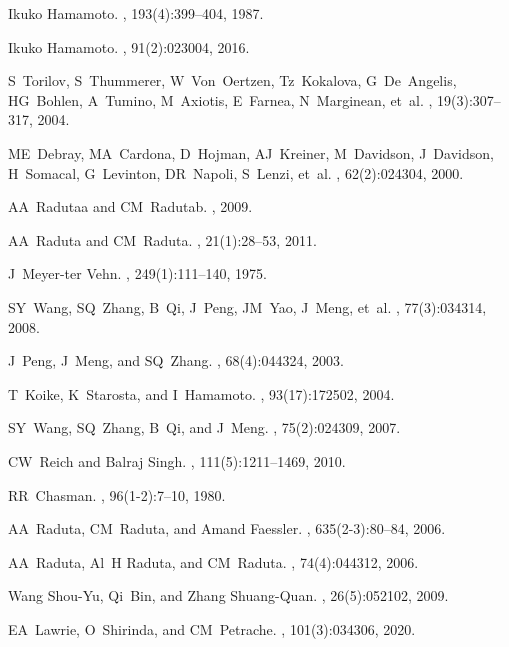 \documentclass[myclassdoc,debug]{rjparticle}
\begin{document}
\begin{thebibliography}{99}
Ikuko Hamamoto.
, 193(4):399--404, 1987.

Ikuko Hamamoto.
, 91(2):023004, 2016.

S~Torilov, S~Thummerer, W~Von~Oertzen, Tz~Kokalova, G~De~Angelis, HG~Bohlen,
  A~Tumino, M~Axiotis, E~Farnea, N~Marginean, et~al.
,
  19(3):307--317, 2004.

ME~Debray, MA~Cardona, D~Hojman, AJ~Kreiner, M~Davidson, J~Davidson, H~Somacal,
  G~Levinton, DR~Napoli, S~Lenzi, et~al.
, 62(2):024304, 2000.

AA~Radutaa and CM~Radutab.
, 2009.

AA~Raduta and CM~Raduta.
, 21(1):28--53,
  2011.

J~Meyer-ter Vehn.
, 249(1):111--140, 1975.

SY~Wang, SQ~Zhang, B~Qi, J~Peng, JM~Yao, J~Meng, et~al.
, 77(3):034314, 2008.

J~Peng, J~Meng, and SQ~Zhang.
, 68(4):044324, 2003.

T~Koike, K~Starosta, and I~Hamamoto.
, 93(17):172502, 2004.

SY~Wang, SQ~Zhang, B~Qi, and J~Meng.
, 75(2):024309, 2007.

CW~Reich and Balraj Singh.
, 111(5):1211--1469, 2010.

RR~Chasman.
, 96(1-2):7--10, 1980.

AA~Raduta, CM~Raduta, and Amand Faessler.
, 635(2-3):80--84, 2006.

AA~Raduta, Al~H Raduta, and CM~Raduta.
, 74(4):044312, 2006.

Wang Shou-Yu, Qi~Bin, and Zhang Shuang-Quan.
, 26(5):052102, 2009.

EA~Lawrie, O~Shirinda, and CM~Petrache.
, 101(3):034306, 2020.

\end{thebibliography}
\end{document}
